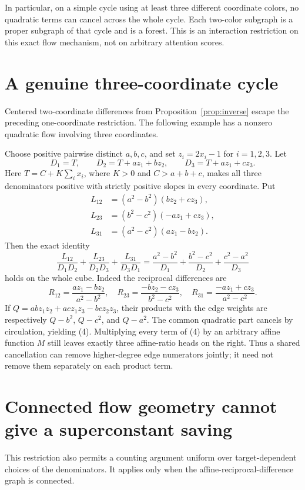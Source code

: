 \documentclass[11pt]{article}
\begin{document}
In particular, on a simple cycle using at least three different
coordinate colors, no quadratic terms can cancel across the whole
cycle. Each two-color subgraph is a proper subgraph of that cycle and
is a forest. This is an interaction restriction on this exact flow
mechanism, not on arbitrary attention scores.

\section{A genuine three-coordinate cycle}

Centered two-coordinate differences from Proposition~\ref{prop:inverse}
escape the preceding one-coordinate restriction. The following example
has a nonzero quadratic flow involving three coordinates.

Choose positive pairwise distinct $a,b,c$, and set $z_i=2x_i-1$ for
$i=1,2,3$. Let
\[
 D_1=T,\qquad D_2=T+az_1+bz_2,\qquad
 D_3=T+az_1+cz_3.
\]
Here $T=C+K\sum_i x_i$, where $K>0$ and $C>a+b+c$, makes all three
denominators positive with strictly positive slopes in every coordinate.
Put
\[
 \begin{split}
 L_{12}&=(a^2-b^2)(bz_2+cz_3),\\
 L_{23}&=(b^2-c^2)(-az_1+cz_3),\\
 L_{31}&=(a^2-c^2)(az_1-bz_2).
 \end{split}
\]
Then the exact identity
\[
 \frac{L_{12}}{D_1D_2}+\frac{L_{23}}{D_2D_3}
 +\frac{L_{31}}{D_3D_1}
 =\frac{a^2-b^2}{D_1}+\frac{b^2-c^2}{D_2}
 +\frac{c^2-a^2}{D_3}
 \tag{4}
\]
holds on the whole cube. Indeed the reciprocal differences are
\[
 R_{12}=\frac{az_1-bz_2}{a^2-b^2},\quad
 R_{23}=\frac{-bz_2-cz_3}{b^2-c^2},\quad
 R_{31}=\frac{-az_1+cz_3}{a^2-c^2}.
\]
If $Q=abz_1z_2+acz_1z_3-bcz_2z_3$, their products with the edge
weights are respectively $Q-b^2$, $Q-c^2$, and $Q-a^2$.
The common quadratic part cancels by circulation, yielding (4).
Multiplying every term of (4) by an arbitrary affine function $M$
still leaves exactly three affine-ratio heads on the right. Thus a
shared cancellation can remove higher-degree edge numerators jointly;
it need not remove them separately on each product term.

\section{Connected flow geometry cannot give a superconstant saving}

This restriction also permits a counting argument uniform over
target-dependent choices of the denominators. It applies only when the
affine-reciprocal-difference graph is connected.
\end{document}
